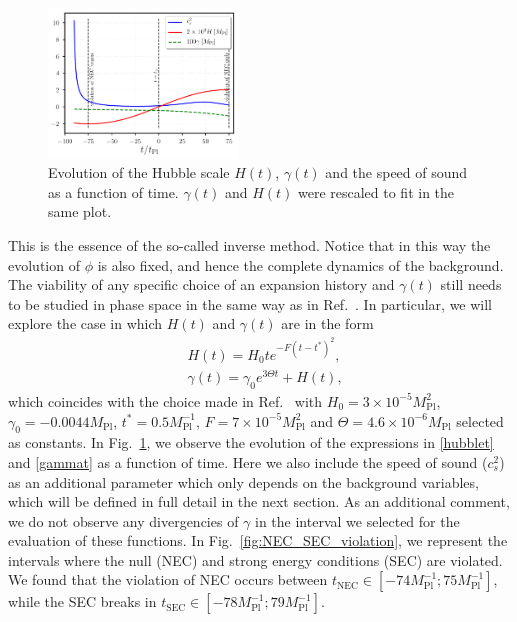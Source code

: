\documentclass[aps,prd,reprint,twocolumn,showpacs,nofootinbib,superscriptaddress,floatfix]{revtex4-1}
\begin{document}
\begin{figure}
\begin{center}
\includegraphics[width=0.45\textwidth]{full_background.pdf}
\caption{Evolution of the Hubble scale $H(t)$, $\gamma(t)$ and the speed of sound as a function of time. $\gamma(t)$ and $H(t)$ were rescaled to fit in the same plot.}
\label{fig:full_back}
\end{center}
\end{figure}

This is the essence of the so-called inverse method. Notice that in this way the evolution of $\phi$ is also fixed, and hence the complete dynamics of the background. The viability of any specific choice of an expansion history and $\gamma(t)$ still needs to be studied in phase space in the same way as in Ref.~\cite{Easson:2011zy}. In particular, we will explore the case in which $H(t)$ and $\gamma(t)$ are in the form
\begin{eqnarray}
&H(t) = H_0t e^{-F(t-t^*)^2},\label{hubblet}\\
&\gamma(t) = \gamma_0e^{3\Theta t}+H(t),\label{gammat}
\end{eqnarray}
which coincides with the choice made in Ref.~\cite{Ijjas:2016tpn} with $H_0=3\times 10^{-5}M_{\mathrm{Pl}}^2$, $\gamma_0=-0.0044M_{\mathrm{Pl}}$, $t^*=0.5M_{\mathrm{Pl}}^{-1}$, $F=7\times 10^{-5}M_{\mathrm{Pl}}^2$ and $\Theta=4.6\times10^{-6}M_{\mathrm{Pl}}$ selected as constants. In Fig.~\ref{fig:full_back}, we observe the evolution of the expressions in \eqref{hubblet} and \eqref{gammat} as a function of time. Here we also include the speed of sound ($c_s^2$) as an additional parameter which only depends on the background variables, which will be defined in full detail in the next section. As an additional comment, we do not observe any divergencies of $\gamma$ in the interval we selected for the evaluation of these functions. In Fig.~\ref{fig:NEC_SEC_violation}, we represent the intervals where the null (NEC) and strong energy conditions (SEC) are violated. We found that the violation of NEC occurs between $t_{\mathrm{NEC}}\in[-74M_{\mathrm{Pl}}^{-1};75M_{\mathrm{Pl}}^{-1}]$, while the SEC breaks in  $t_{\mathrm{SEC}}\in[-78M_{\mathrm{Pl}}^{-1};79M_{\mathrm{Pl}}^{-1}]$.
\end{document}
